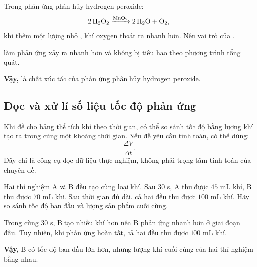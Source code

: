 \begin{vidu}
Trong phản ứng phân hủy hydrogen peroxide:
\[
\ce{2H2O2 ->[MnO2] 2H2O + O2},
\]
khi thêm một lượng nhỏ , khí oxygen thoát ra nhanh hơn. Nêu vai trò của .
\end{vidu}
\begin{loigiai}
 làm phản ứng xảy ra nhanh hơn và không bị tiêu hao theo phương trình tổng quát.

\textbf{Vậy,}  là chất xúc tác của phản ứng phân hủy hydrogen peroxide.
\end{loigiai}

\subsection{Đọc và xử lí số liệu tốc độ phản ứng}

Khi đề cho bảng thể tích khí theo thời gian, có thể so sánh tốc độ bằng lượng khí tạo ra trong cùng một khoảng thời gian. Nếu đề yêu cầu tính toán, có thể dùng:
\[
\frac{\Delta V}{\Delta t}.
\]
Đây chỉ là công cụ đọc dữ liệu thực nghiệm, không phải trọng tâm tính toán của chuyên đề.

\begin{vidu}
Hai thí nghiệm A và B đều tạo cùng loại khí. Sau $30$ s, A thu được $45$ mL khí, B thu được $70$ mL khí. Sau thời gian đủ dài, cả hai đều thu được $100$ mL khí. Hãy so sánh tốc độ ban đầu và lượng sản phẩm cuối cùng.
\end{vidu}
\begin{loigiai}
Trong cùng $30$ s, B tạo nhiều khí hơn nên B phản ứng nhanh hơn ở giai đoạn đầu. Tuy nhiên, khi phản ứng hoàn tất, cả hai đều thu được $100$ mL khí.

\textbf{Vậy,} B có tốc độ ban đầu lớn hơn, nhưng lượng khí cuối cùng của hai thí nghiệm bằng nhau.
\end{loigiai}
